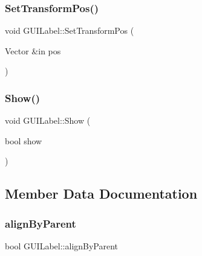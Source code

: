 \hypertarget{class_g_u_i_label_ab630591bc354b44170a7c1e65d3b47bc}{}\label{class_g_u_i_label_ab630591bc354b44170a7c1e65d3b47bc} 
\subsubsection{\texorpdfstring{Set\+Transform\+Pos()}{SetTransformPos()}}
{\footnotesize\ttfamily void G\+U\+I\+Label\+::\+Set\+Transform\+Pos (\begin{DoxyParamCaption}\item[{Vector \&in}]{pos }\end{DoxyParamCaption})}

\hypertarget{class_g_u_i_label_a5a70d1509e3e1ddec286c154bf2cc2d3}{}\label{class_g_u_i_label_a5a70d1509e3e1ddec286c154bf2cc2d3} 
\subsubsection{\texorpdfstring{Show()}{Show()}}
{\footnotesize\ttfamily void G\+U\+I\+Label\+::\+Show (\begin{DoxyParamCaption}\item[{bool}]{show }\end{DoxyParamCaption})}



\subsection{Member Data Documentation}
\hypertarget{class_g_u_i_label_a832c3e5be12afaec20a900dc8229acc7}{}\label{class_g_u_i_label_a832c3e5be12afaec20a900dc8229acc7} 
\subsubsection{\texorpdfstring{align\+By\+Parent}{alignByParent}}
{\footnotesize\ttfamily bool G\+U\+I\+Label\+::align\+By\+Parent}

\hypertarget{class_g_u_i_label_ae89bb242fbe17884b80ad86e725532e4}{}\label{class_g_u_i_label_ae89bb242fbe17884b80ad86e725532e4} 
